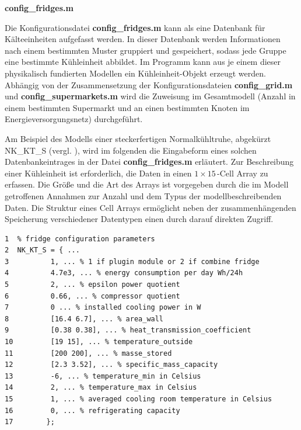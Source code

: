 \vspace{3mm}%
\noindent\textbf{config\_fridges.m}
\vspace{3mm}

Die Konfigurationsdatei \textbf{config\_fridges.m} kann als eine Datenbank für
Kälteeinheiten aufgefasst werden. In dieser Datenbank werden Informationen nach
einem bestimmten Muster gruppiert und gespeichert, sodass jede Gruppe eine
bestimmte Kühleinheit abbildet. Im Programm kann aus
je einem dieser physikalisch fundierten Modellen ein Kühleinheit-Objekt
erzeugt werden. Abhängig von der Zusammensetzung der Konfigurationsdateien
\textbf{config\_grid.m} und \textbf{config\_supermarkets.m} wird die Zuweisung
im Gesamtmodell (Anzahl in einem bestimmten Supermarkt und an einen bestimmten
Knoten im Energieversorgungsnetz) durchgeführt.

Am Beispiel des Modells einer steckerfertigen
Normalkühltruhe, abgekürzt NK\_KT\_S (vergl.
), wird im folgenden die Eingabeform eines solchen
Datenbankeintrages in der Datei \textbf{config\_fridges.m} erläutert. Zur
Beschreibung einer Kühleinheit ist erforderlich, die Daten in einen
$1\times15\,$-Cell Array zu erfassen.  Die Größe und die Art des Arrays ist
vorgegeben durch die im Modell getroffenen Annahmen zur
Anzahl und dem Typus der modellbeschreibenden Daten. Die Struktur eines Cell
Arrays ermöglicht neben der zusammenhängenden Speicherung verschiedener
Datentypen einen durch \matlab darauf direkten Zugriff.

\begin{lstlisting}[caption=config\_fridges.m,label={fridge}]
1  % fridge configuration parameters
2  NK_KT_S = { ...
3          1, ... % 1 if plugin module or 2 if combine fridge
4          4.7e3, ... % energy consumption per day Wh/24h
5          2, ... % epsilon power quotient
6          0.66, ... % compressor quotient
7          0 ... % installed cooling power in W
8          [16.4 6.7], ... % area_wall
9          [0.38 0.38], ... % heat_transmission_coefficient
10         [19 15], ... % temperature_outside
11         [200 200], ... % masse_stored
12         [2.3 3.52], ... % specific_mass_capacity
13         -6, ... % temperature_min in Celsius
14         2, ... % temperature_max in Celsius
15         1, ... % averaged cooling room temperature in Celsius
16         0, ... % refrigerating capacity
17        };
\end{lstlisting}

